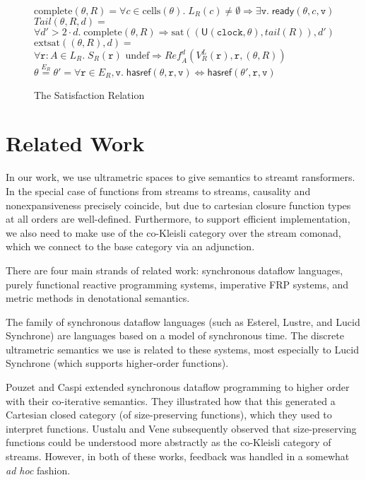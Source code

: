 \documentclass[preprint]{sigplanconf}
\newcommand{\ready}[3]{\mathsf{ready}({#1}, {#2}, {#3})}
\newcommand{\cells}[1]{\mathrm{cells}({#1})}
\newcommand{\hasref}[3]{\mathsf{hasref}({#1}, {#2}, {#3})}
\renewcommand{\implies}{\Rightarrow}
\newcommand{\term}[1]{\ensuremath{\mathtt{{#1}}}}
\newcommand{\Tail}{\mathit{Tail}}
\newcommand{\Ref}{\mathit{Ref}}
\newcommand{\tail}[1]{\mathit{tail}(#1)}
\newcommand{\ramify}[1]{\mathsf{U}(\mathtt{clock}, {#1})}
\newcommand{\einvariant}[3]{{#2} \stackrel{#1}{=} {#3}}
\newcommand{\satisfy}[2]{\mathrm{sat}({#1},{#2})}
\newcommand{\satisfyext}[2]{\mathrm{extsat}({#1}, {#2})}
\newcommand{\complete}[1]{\mathrm{complete}(#1)}
\begin{document}
\begin{figure}
\begin{tabbing}
$\complete{\theta,R} = \forall c \in \cells{\theta}.\; L_R(c) \not= \emptyset \implies \exists \term{v}.\;\ready{\theta}{c}{\term{v}}$
\\[1em]

$\Tail(\theta, R, d) = $ \\
\>$\forall d' > 2\cdot d.\; \complete{\theta, R} \implies \satisfy{(\ramify{\theta}, \tail{R})}{d'}$  
\\[1em]

$\satisfyext{(\theta,R)}{d} = $ \\
\> $\forall \term{r}:A \in L_R.\; S_R(\term{r}) \mbox{ undef} \implies \Ref^d_A(V^L_R(\term{r}), \term{r}, (\theta,R))$ \\[1em]

$\einvariant{E_R}{\theta}{\theta'} = \forall \term{r} \in E_R, \term{v}.\; \hasref{\theta}{\term{r}}{\term{v}} \iff \hasref{\theta'}{\term{r}}{\term{v}}$
\end{tabbing}
\caption{The Satisfaction Relation}
\label{satisfaction-relation}
\end{figure}





\section{Related Work}

In our work, we use ultrametric spaces to give semantics to streamt
ransformers. In the special case of functions from streams to
streams, causality and nonexpansiveness precisely coincide, but due to
cartesian closure function types at all orders are well-defined.
Furthermore, to support efficient implementation, we also need to make
use of the co-Kleisli category over the stream comonad, which we 
connect to the base category via an adjunction. 

There are four main strands of related work: synchronous dataflow
languages, purely functional reactive programming systems, imperative
FRP systems, and metric methods in denotational semantics.

The family of synchronous dataflow languages (such as Esterel, Lustre,
and Lucid Synchrone) are languages based on a model of synchronous
time. The discrete ultrametric semantics we use is related to these
systems, most especially to Lucid Synchrone (which supports
higher-order functions).

Pouzet and Caspi extended synchronous dataflow programming to higher
order with their co-iterative semantics. They illustrated how that
this generated a Cartesian closed category (of size-preserving
functions), which they used to interpret functions. Uustalu and Vene
subsequently observed that size-preserving functions could be
understood more abstractly as the co-Kleisli category of
streams. However, in both of these works, feedback was handled in a
somewhat \emph{ad hoc} fashion.
\end{document}
